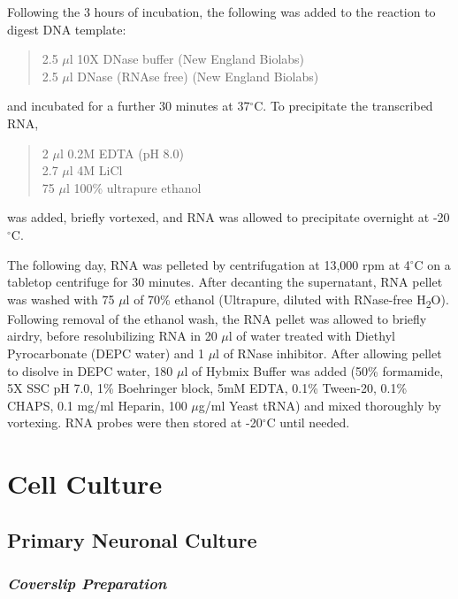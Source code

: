 \documentclass[onehalf,12pt]{beavtex}
\begin{document}
  Following the 3 hours of incubation, the following was added to the
  reaction to digest DNA template:
  
  \begin{quote}
  2.5 \(\mu\)l 10X DNase buffer (New England Biolabs)\\
  2.5 \(\mu\)l DNase (RNAse free) (New England Biolabs)
  \end{quote}
  
  and incubated for a further 30 minutes at 37\(^\circ\)C. To precipitate
  the transcribed RNA,
  
  \begin{quote}
  2 \(\mu\)l 0.2M EDTA (pH 8.0)\\
  2.7 \(\mu\)l 4M LiCl\\
  75 \(\mu\)l 100\% ultrapure ethanol
  \end{quote}
  
  was added, briefly vortexed, and RNA was allowed to precipitate
  overnight at -20\(^\circ\)C.
  
  The following day, RNA was pelleted by centrifugation at 13,000 rpm at
  4\(^\circ\)C on a tabletop centrifuge for 30 minutes. After decanting
  the supernatant, RNA pellet was washed with 75 \(\mu\)l of 70\% ethanol
  (Ultrapure, diluted with RNase-free H\textsubscript{2}O). Following
  removal of the ethanol wash, the RNA pellet was allowed to briefly
  airdry, before resolubilizing RNA in 20 \(\mu\)l of water treated with
  Diethyl Pyrocarbonate (DEPC water) and 1 \(\mu\)l of RNase inhibitor.
  After allowing pellet to disolve in DEPC water, 180 \(\mu\)l of Hybmix
  Buffer was added (50\% formamide, 5X SSC pH 7.0, 1\% Boehringer block,
  5mM EDTA, 0.1\% Tween-20, 0.1\% CHAPS, 0.1 mg/ml Heparin, 100
  \(\mu\)g/ml Yeast tRNA) and mixed thoroughly by vortexing. RNA probes
  were then stored at -20\(^\circ\)C until needed.
  
  \section{Cell Culture}\label{cell-culture}
  
  \subsection{Primary Neuronal Culture}\label{primary-neuronal-culture}
  
  \subsubsection*{\texorpdfstring{\emph{Coverslip
  Preparation}}{Coverslip Preparation}}\label{coverslip-preparation}
  
\end{document}

